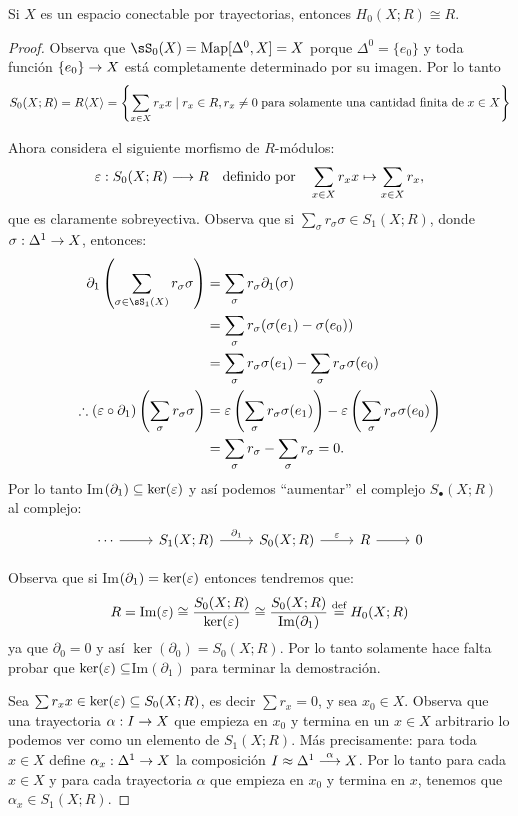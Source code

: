 \documentclass[../../topologia_algebraica]{subfiles}
\begin{document}
\begin{prop}\label{prop:0_homologia_cpa}
  Si $X$ es un espacio conectable por trayectorias, entonces $H_0(X;R)\cong R$.
\end{prop}

\begin{proof}
  Observa que $\sS_0(X)=\text{Map}[\Delta^0,X]=X$ porque $\Delta^0=\{e_0\}$ y toda funci\'on
  $\{e_0\}\rightarrow X$ est\'a completamente determinado por su imagen. Por lo tanto
  \[
    S_0(X;R)=R\langle X \rangle=\left\{\sum_{x\in X} r_x x \mid
      r_x\in R, r_x\neq 0\;\text{para solamente una cantidad finita de}\;x\in X\right\}
  \]

  Ahora considera el siguiente morfismo de $R$-m\'odulos:
  \[
    \varepsilon:S_0(X;R) \longrightarrow R \quad\text{definido por}\quad \sum_{x\in X}r_x x \mapsto \sum_{x\in X} r_x,
  \]
  que es claramente sobreyectiva.
  Observa que si $\sum_{\sigma}r_{\sigma}\sigma\in S_1(X;R)$, donde $\sigma:\Delta^1\rightarrow X$, entonces:
  \begin{align*}
    \partial_1\paren{\sum_{\sigma\in\sS_1(X)}r_{\sigma}\sigma} & =
    \sum_{\sigma}r_{\sigma}\partial_1(\sigma) \\ & =
    \sum_{\sigma}r_{\sigma}(\sigma(e_1)-\sigma(e_0)) \\ & =
    \sum_{\sigma}r_{\sigma}\sigma(e_1)-\sum_{\sigma}r_{\sigma}\sigma(e_0) \\
    \therefore (\eps\circ\partial_1)\paren{\sum_{\sigma}r_{\sigma}\sigma} &=%
    \eps\paren{\sum_{\sigma}r_{\sigma}\sigma(e_1)}-\eps\paren{\sum_{\sigma}r_{\sigma}\sigma(e_0)} \\ & =
    \sum_{\sigma}r_{\sigma}-\sum_{\sigma}r_{\sigma}=0.
  \end{align*}
  Por lo tanto Im$(\partial_1)\subseteq\ker(\varepsilon)$ y as\'i podemos ``aumentar'' el complejo
  $S_{\bullet}(X;R)$ al complejo:
  \[
    \begin{tikzcd}
      \cdots \arrow[r] & S_1(X;R) \arrow[r,"\partial_1"] & S_0(X;R) \arrow[r,"\eps"] & R \arrow[r] & 0
    \end{tikzcd}
  \]

  Observa que si Im$(\partial_1)=\ker(\varepsilon)$ entonces tendremos que:
  \[
    R=\text{Im}(\varepsilon)\cong \frac{S_0(X;R)}{\ker(\varepsilon)}\cong
    \frac{S_0(X;R)}{\text{Im}(\partial_1)} \stackrel{\text{def}}{=} H_0(X;R)
  \]
  ya que $\partial_0=0$ y as\'i $\ker(\partial_0)=S_0(X;R)$. Por lo tanto solamente hace falta probar que
  $\ker(\varepsilon)\subseteq$Im$(\partial_1)$ para terminar la demostraci\'on.
  
  Sea $\sum r_x x\in\ker(\varepsilon)\subseteq S_0(X;R)$, es decir $\sum r_x =0$, y sea $x_0\in X$.
  Observa que una trayectoria $\alpha:I\rightarrow X$ que empieza en $x_0$ y termina en un $x\in X$
  arbitrario lo podemos ver como un elemento de $S_1(X;R)$.
  M\'as precisamente: para toda $x\in X$ define $\alpha_x:\Delta^1\rightarrow X$ la composici\'on
  $I\approx\Delta^1\overset{\alpha}{\longrightarrow} X$. Por lo tanto para cada $x\in X$ y para cada trayectoria
  $\alpha$ que empieza en $x_0$ y termina en $x$, tenemos que
  $\alpha_x\in S_1(X;R)$.


\end{proof}
\end{document}
